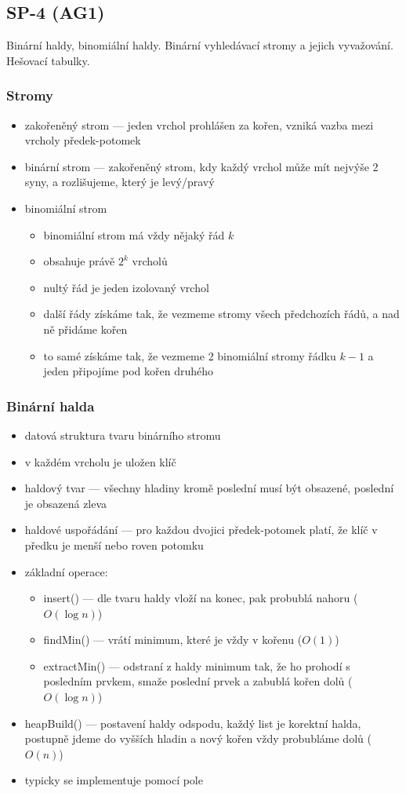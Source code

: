\subsection{SP-4 (AG1)}
Binární haldy, binomiální haldy. Binární vyhledávací stromy a jejich vyvažování. Hešovací tabulky.

\subsubsection*{Stromy}
\begin{itemize}
	\item zakořeněný strom --- jeden vrchol prohlášen za kořen, vzniká vazba mezi vrcholy předek-potomek
	\item binární strom --- zakořeněný strom, kdy každý vrchol může mít nejvýše 2 syny, a rozlišujeme, který je levý/pravý
	\item binomiální strom
	\begin{itemize}
		\item binomiální strom má vždy nějaký řád $k$
		\item obsahuje právě $2^k$ vrcholů
		\item nultý řád je jeden izolovaný vrchol
		\item další řády získáme tak, že vezmeme stromy všech předchozích řádů, a nad ně přidáme kořen
		\item to samé získáme tak, že vezmeme 2 binomiální stromy řádku $k-1$ a jeden připojíme pod kořen druhého
	\end{itemize}
\end{itemize}

\subsubsection*{Binární halda}
\begin{itemize}
	\item datová struktura tvaru binárního stromu
	\item v každém vrcholu je uložen klíč
	\item haldový tvar --- všechny hladiny kromě poslední musí být obsazené, poslední je obsazená zleva
	\item haldové uspořádání --- pro každou dvojici předek-potomek platí, že klíč v předku je menší nebo roven potomku
	\item základní operace:
	\begin{itemize}
		\item insert() --- dle tvaru haldy vloží na konec, pak probublá nahoru ($O(\log n)$)
		\item findMin() --- vrátí minimum, které je vždy v kořenu ($O(1)$)
		\item extractMin() --- odstraní z haldy minimum tak, že ho prohodí s posledním prvkem, smaže poslední prvek a zabublá kořen dolů ($O(\log n)$)
	\end{itemize}
	\item heapBuild() --- postavení haldy odspodu, každý list je korektní halda, postupně jdeme do vyšších hladin a nový kořen vždy probubláme dolů ($O(n)$)
	\item typicky se implementuje pomocí pole
\end{itemize}

